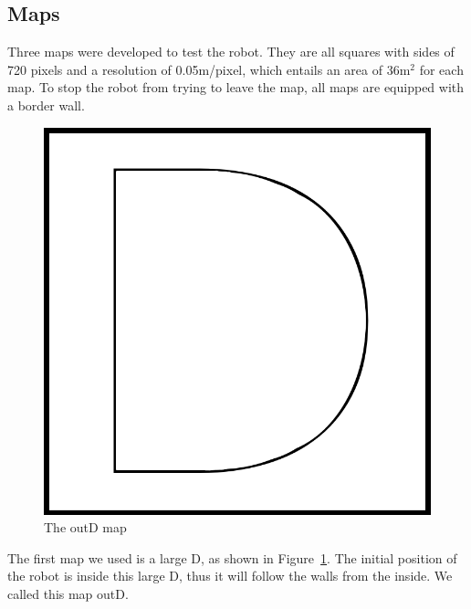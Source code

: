 \documentclass[10pt,journal,compsoc]{IEEEtran}
\begin{document}
\subsection{Maps}
Three maps were developed to test the robot. They are all squares with sides of 720 pixels and a resolution of 0.05m/pixel, which entails an area of 36m$^2$ for each map. To stop the robot from trying to leave the map, all maps are equipped with a border wall.

\begin{figure}[thpb]
\centering
\includegraphics[scale=0.2]{img/outD.png}
\caption{The outD map}
\label{fig:outD_map}
\end{figure}

The first map we used is a large D, as shown in Figure~\ref{fig:outD_map}. The initial position of the robot is inside this large D, thus it will follow the walls from the inside. We called this map outD.
\end{document}

